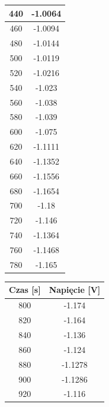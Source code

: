 \begin{multicols}{3}
\begin{center}
\begin{tabular}{|c|c|}
            440          & -1.0064          \\ \hline
            460          & -1.0094          \\ \hline
            480          & -1.0144          \\ \hline
            500          & -1.0119          \\ \hline
            520          & -1.0216          \\ \hline
            540          & -1.023           \\ \hline
            560          & -1.038           \\ \hline
            580          & -1.039           \\ \hline
            600          & -1.075           \\ \hline
            620          & -1.1111          \\ \hline
            640          & -1.1352          \\ \hline
            660          & -1.1556          \\ \hline
            680          & -1.1654          \\ \hline
            700          & -1.18            \\ \hline
            720          & -1.146           \\ \hline
            740          & -1.1364          \\ \hline
            760          & -1.1468          \\ \hline
            780          & -1.165           \\ \hline
        \end{tabular}
        \begin{tabular}{|c|c|}
            \hline
            Czas {[}s{]} & Napięcie {[}V{]} \\ \hline \hline
            800          & -1.174           \\ \hline
            820          & -1.164           \\ \hline
            840          & -1.136           \\ \hline
            860          & -1.124           \\ \hline
            880          & -1.1278          \\ \hline
            900          & -1.1286          \\ \hline
            920          & -1.116           \\ \hline

\end{tabular}
\end{center}
\end{multicols}
